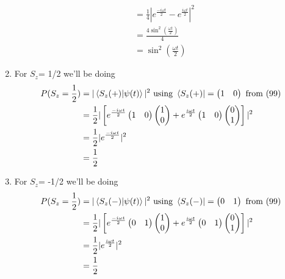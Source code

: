 \documentclass{article}
\begin{document}
\begin{enumerate}[label=\alph*)]
\begin{align*}
		&= \frac{1}{4} | e^{\frac{-i\omega t}{2}} - e^{\frac{i\omega t}{2}} |^2 \\
		&= \frac{4\sin^2(\frac{\omega t}{2})}{4} \\
		&= \sin^2(\frac{\omega t}{2})
	\end{align*}
	\item %
	For $S_z$= 1/2 we'll be doing
	\begin{align*}
		P(S_z=\frac{1}{2}) &= | \bra{S_z(+)} \ket{\psi(t)} |^2 \text{ using } \bra{S_z(+)} 
		= \begin{pmatrix} 1 & 0 \end{pmatrix} \text{ from (99)} \\
		&= \frac{1}{2} | \left[ e^{\frac{-i\omega t}{2}} \begin{pmatrix} 1 & 0 \end{pmatrix} \begin{pmatrix} 1 \\ 0 \end{pmatrix} 
		+ e^{\frac{i\omega t}{2}}  \begin{pmatrix} 1 & 0 \end{pmatrix} \begin{pmatrix} 0 \\ 1 \end{pmatrix} \right] |^2 \\
		&= \frac{1}{2} | e^{\frac{-i\omega t}{2}} |^2 \\
		&= \frac{1}{2}
	\end{align*}
	\item %
	For $S_z$= -1/2 we'll be doing
	\begin{align*}
		P(S_z=\frac{1}{2}) &= | \bra{S_z(-)} \ket{\psi(t)} |^2 \text{ using } \bra{S_z(-)} 
		= \begin{pmatrix} 0 & 1 \end{pmatrix} \text{ from (99)} \\
		&= \frac{1}{2} | \left[ e^{\frac{-i\omega t}{2}} \begin{pmatrix} 0 & 1 \end{pmatrix} \begin{pmatrix} 1 \\ 0 \end{pmatrix} 
		+ e^{\frac{i\omega t}{2}}  \begin{pmatrix} 0 & 1 \end{pmatrix} \begin{pmatrix} 0 \\ 1 \end{pmatrix} \right] |^2 \\
		&= \frac{1}{2} | e^{\frac{i\omega t}{2}} |^2 \\
		&= \frac{1}{2}
	\end{align*}
\end{enumerate}
\end{document}
